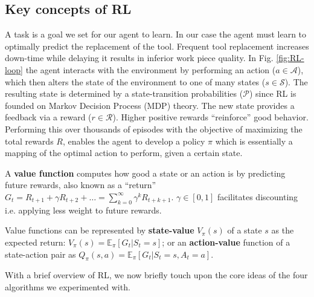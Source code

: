 \documentclass[a4paper, 12pt]{article}
\begin{document}
\subsection{Key concepts of RL}
A task is a goal we set for our agent to learn. In our case the agent must learn to optimally predict the replacement of the tool. Frequent tool replacement increases down-time while delaying it results in inferior work piece quality. In Fig. \ref{fig:RL-loop} the agent interacts with the environment by performing an action ($a \in \mathcal{A}$), which then alters the state of the environment to one of many states ($s \in \mathcal{S}$). The resulting state is determined by a state-transition probabilities ($\mathcal{P}$) since RL is founded on Markov Decision Process (MDP) theory. The new state provides a feedback via a reward ($r \in \mathcal{R}$). Higher positive rewards ``reinforce'' good behavior. Performing this over thousands of episodes with the objective of maximizing the total rewards $R$, enables the agent to develop a policy $\pi$ which is essentially a mapping of the optimal action to perform, given a certain state.

A \textbf{value function} computes how good a state or an action is by predicting future rewards, also known as a ``return'' $G_t = R_{t+1} + \gamma R_{t+2} + \dots = \sum_{k=0}^{\infty} \gamma^k R_{t+k+1}$. $\gamma \in [0, 1]$ facilitates discounting i.e. applying less weight to future rewards. 

Value functions can be represented by \textbf{state-value} $V_{\pi}(s)$ of a state $s$ as the expected return: $V_{\pi}(s) = \mathbb{E}_{\pi}[G_t \vert S_t = s]$; or an \textbf{action-value} function of a state-action pair as $Q_{\pi}(s, a) = \mathbb{E}_{\pi}[G_t \vert S_t = s, A_t = a]$.



With a brief overview of RL, we now briefly touch upon the core ideas of the four algorithms we experimented with.
\end{document}
